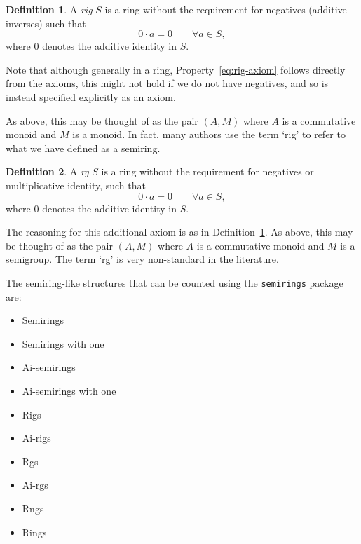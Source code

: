 \documentclass{article}
\theoremstyle{definition}
\newtheorem{definition}{Definition}
\begin{document}
\begin{definition}
    \label{def:rig}
    A \emph{rig} \(S\) is a ring without the requirement for negatives (additive inverses) such that
    \begin{equation}
        \label{eq:rig-axiom}
        0\cdot a=0\qquad\forall a\in S,
    \end{equation}
    where \(0\) denotes the additive identity in \(S\).
    
    Note that although generally in a ring, Property~\eqref{eq:rig-axiom} follows directly from the axioms, this might not hold if we do not have negatives, and so is instead specified explicitly as an axiom.

    As above, this may be thought of as the pair \((A, M)\) where \(A\) is a commutative monoid and \(M\) is a monoid. In fact, many authors use the term `rig' to refer to what we have defined as a semiring.

\end{definition}
\begin{definition}
    A \emph{rg} \(S\) is a ring without the requirement for negatives or multiplicative identity, such that    
    \begin{equation*}
        0\cdot a=0\qquad\forall a\in S,
    \end{equation*}
    where \(0\) denotes the additive identity in \(S\).
    
    The reasoning for this additional axiom is as in Definition~\ref{def:rig}. As above, this may be thought of as the pair \((A, M)\) where \(A\) is a commutative monoid and \(M\) is a semigroup. The term `rg' is very non-standard in the literature.
\end{definition}

The semiring-like structures that can be counted using the \texttt{semirings} package are:

\begin{multicols}{2}
\begin{itemize}
    \item Semirings
    \item Semirings with one
    \item Ai-semirings
    \item Ai-semirings with one
    \item Rigs
    \item Ai-rigs
    \item Rgs
    \item Ai-rgs
    \item Rngs
    \item Rings
\end{itemize}
\end{multicols}
\end{document}
